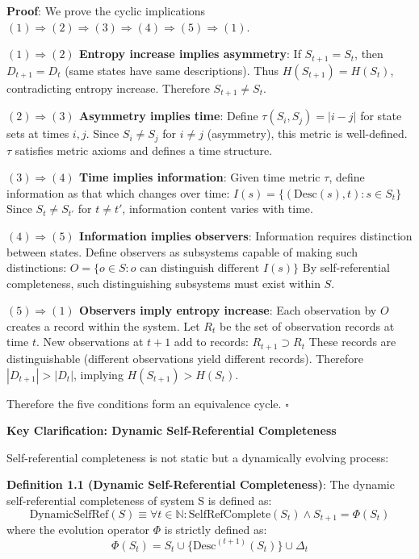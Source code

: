 \textbf{Proof}: We prove the cyclic implications $(1) \Rightarrow (2) \Rightarrow (3) \Rightarrow (4) \Rightarrow (5) \Rightarrow (1)$.

\textbf{$(1) \Rightarrow (2)$ Entropy increase implies asymmetry}:
If $S_{t+1} = S_t$, then $D_{t+1} = D_t$ (same states have same descriptions).
Thus $H(S_{t+1}) = H(S_t)$, contradicting entropy increase.
Therefore $S_{t+1} \neq S_t$.

\textbf{$(2) \Rightarrow (3)$ Asymmetry implies time}:
Define $\tau(S_i, S_j) = |i - j|$ for state sets at times $i, j$.
Since $S_i \neq S_j$ for $i \neq j$ (asymmetry), this metric is well-defined.
$\tau$ satisfies metric axioms and defines a time structure.

\textbf{$(3) \Rightarrow (4)$ Time implies information}:
Given time metric $\tau$, define information as that which changes over time:
$I(s) = \{(\text{Desc}(s), t): s \in S_t\}$
Since $S_t \neq S_{t'}$ for $t \neq t'$, information content varies with time.

\textbf{$(4) \Rightarrow (5)$ Information implies observers}:
Information requires distinction between states.
Define observers as subsystems capable of making such distinctions:
$O = \{o \in S: o \text{ can distinguish different } I(s)\}$
By self-referential completeness, such distinguishing subsystems must exist within $S$.

\textbf{$(5) \Rightarrow (1)$ Observers imply entropy increase}:
Each observation by $O$ creates a record within the system.
Let $R_t$ be the set of observation records at time $t$.
New observations at $t+1$ add to records: $R_{t+1} \supset R_t$
These records are distinguishable (different observations yield different records).
Therefore $|D_{t+1}| > |D_t|$, implying $H(S_{t+1}) > H(S_t)$.

Therefore the five conditions form an equivalence cycle. $\square$

\textbf{Key Clarification: Dynamic Self-Referential Completeness}

Self-referential completeness is not static but a dynamically evolving process:

\textbf{Definition 1.1 (Dynamic Self-Referential Completeness)}:
\label{def:1.1}
The dynamic self-referential completeness of system S is defined as:
\begin{equation}
\text{DynamicSelfRef}(S) \equiv \forall t \in \mathbb{N}: \text{SelfRefComplete}(S_t) \land S_{t+1} = \Phi(S_t)
\end{equation}
where the evolution operator $\Phi$ is strictly defined as:
\begin{equation}
\Phi(S_t) = S_t \cup \{\text{Desc}^{(t+1)}(S_t)\} \cup \Delta_t
\end{equation}

